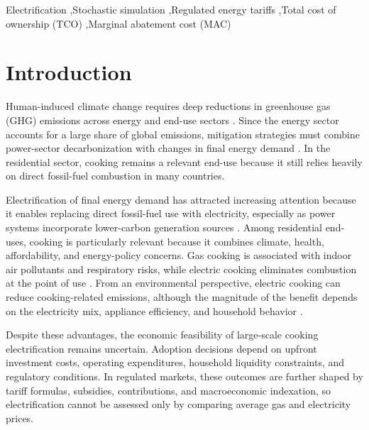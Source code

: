 \documentclass[authoryear,preprint,review,10pt]{elsarticle}
\begin{document}
\begin{frontmatter}
\begin{keyword}
Electrification \sep Stochastic simulation \sep Regulated energy tariffs \sep Total cost of ownership (TCO) \sep Marginal abatement cost (MAC)


\end{keyword}

\end{frontmatter}



\section{Introduction}
\label{introduction}

Human-induced climate change requires deep reductions in greenhouse gas (GHG) emissions across energy and end-use sectors \citep{ipcc_ar6_syr_2023}. Since the energy sector accounts for a large share of global emissions, mitigation strategies must combine power-sector decarbonization with changes in final energy demand \citep{iea_co2_emissions_2023,wri_ghg_2023}. In the residential sector, cooking remains a relevant end-use because it still relies heavily on direct fossil-fuel combustion in many countries.

Electrification of final energy demand has attracted increasing attention because it enables replacing direct fossil-fuel use with electricity, especially as power systems incorporate lower-carbon generation sources \citep{NREL_electrification_enduse_2017}. Among residential end-uses, cooking is particularly relevant because it combines climate, health, affordability, and energy-policy concerns. Gas cooking is associated with indoor air pollutants and respiratory risks, while electric cooking eliminates combustion at the point of use \citep{dennekamp2001,kornartit2010,to2011,dai2021}. From an environmental perspective, electric cooking can reduce cooking-related emissions, although the magnitude of the benefit depends on the electricity mix, appliance efficiency, and household behavior \citep{yangka2016,im2020,lee2021,bandekar2022}.

Despite these advantages, the economic feasibility of large-scale cooking electrification remains uncertain. Adoption decisions depend on upfront investment costs, operating expenditures, household liquidity constraints, and regulatory conditions. In regulated markets, these outcomes are further shaped by tariff formulas, subsidies, contributions, and macroeconomic indexation, so electrification cannot be assessed only by comparing average gas and electricity prices.
\end{document}
